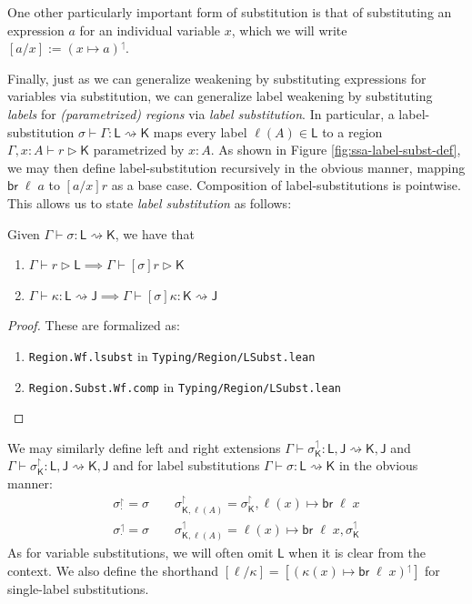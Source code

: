\documentclass[acmsmall,screen,review]{acmart}
\newcommand{\ms}[1]{\ensuremath{\mathsf{#1}}}
\newcommand{\brb}[2]{\ms{br}\;#1\;#2}
\newcommand{\rupg}[1]{{#1}^\upharpoonright}
\newcommand{\lupg}[1]{{#1}^\upharpoonleft}
\newcommand{\haslb}[3]{#1 \vdash #2 \rhd #3}
\newcommand{\lbsubst}[4]{#1 \vdash #2: #3 \rightsquigarrow #4}
\begin{document}
One other particularly important form of substitution is that of substituting an expression $a$ for
an individual variable $x$, which we will write $[a/x] := \lupg{(x \mapsto a)}$.

Finally, just as we can generalize weakening by substituting expressions for variables via
substitution, we can generalize label weakening by substituting \emph{labels} for
\emph{(parametrized) regions} via \emph{label substitution}. In particular, a label-substitution
$\lbsubst{\sigma}{\Gamma}{\ms{L}}{\ms{K}}$ maps every label $\ell(A) \in \ms{L}$ to a region
$\haslb{\Gamma, x : A}{r}{\ms{K}}$ parametrized by $x : A$. As shown in Figure
\ref{fig:ssa-label-subst-def}, we may then define label-substitution recursively in the obvious
manner, mapping $\ms{br}\;\ell\;a$ to $[a/x]r$ as a base case. Composition of label-substitutions is
pointwise. This allows us to state \emph{label substitution} as follows:

\begin{lemma}
  Given $\lbsubst{\Gamma}{\sigma}{\ms{L}}{\ms{K}}$, we have that
  \begin{enumerate}[label=(\alph*)]
    \item $\haslb{\Gamma}{r}{\ms{L}} \implies \haslb{\Gamma}{[\sigma]r}{\ms{K}}$
    \item $\lbsubst{\Gamma}{\kappa}{\ms{L}}{\ms{J}} 
      \implies \lbsubst{\Gamma}{[\sigma]\kappa}{\ms{K}}{\ms{J}}$
  \end{enumerate}
\end{lemma}
\begin{proof}
  These are formalized as:
  \begin{enumerate}[label=(\alph*)]
    \item \texttt{Region.Wf.lsubst} in \texttt{Typing/Region/LSubst.lean}
    \item \texttt{Region.Subst.Wf.comp} in \texttt{Typing/Region/LSubst.lean}
  \end{enumerate}
\end{proof}

We may similarly define left and right extensions $\lbsubst{\Gamma}{\lupg{\sigma}_{\ms{K}}}{\ms{L},
\ms{J}}{\ms{K}, \ms{J}}$ and $\lbsubst{\Gamma}{\rupg{\sigma}_{\ms{K}}}{\ms{L}, \ms{J}}{\ms{K},
\ms{J}}$ and for label substitutions $\lbsubst{\Gamma}{\sigma}{\ms{L}}{\ms{K}}$ in the obvious
manner:
\begin{gather}
  \rupg{\sigma}_{\cdot} = \sigma \qquad 
  \rupg{\sigma}_{\ms{K}, \ell(A)} = \rupg{\sigma}_{\ms{K}}, \ell(x) \mapsto \brb{\ell}{x} \\
  \lupg{\sigma}_{\cdot} = \sigma \qquad
  \lupg{\sigma}_{\ms{K}, \ell(A)} = \ell(x) \mapsto \brb{\ell}{x}, \lupg{\sigma}_{\ms{K}}
\end{gather}
As for variable substitutions, we will often omit $\ms{L}$ when it is clear from the context.
We also define the shorthand $[\ell / \kappa] = [\lupg{(\kappa(x) \mapsto \brb{\ell}{x})}]$ for
single-label substitutions.
\end{document}
